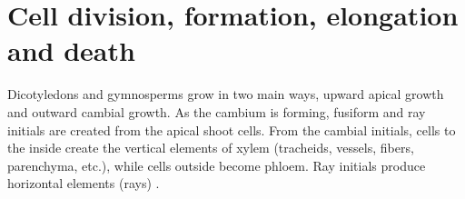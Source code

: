 \section{Cell division, formation, elongation and death}
Dicotyledons and gymnosperms grow in two main ways, upward apical growth and
outward cambial growth.  As the cambium is forming, fusiform and ray initials
are created from the apical shoot cells. From the cambial initials,
cells to the inside create the vertical elements of xylem (tracheids, vessels,
fibers, parenchyma, etc.), while cells outside become phloem. Ray
initials produce horizontal elements (rays) \cite{fromm2013cellular}.